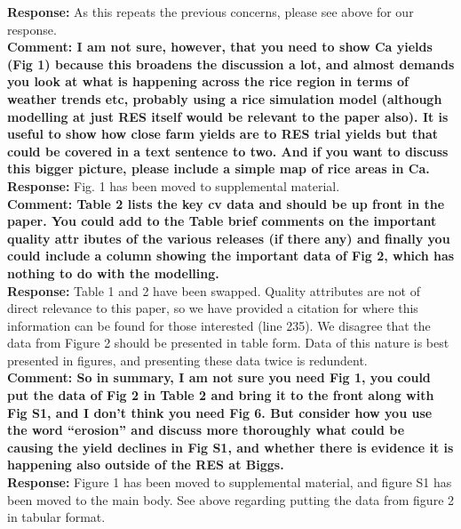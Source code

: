 \documentclass{article} \usepackage[margin=1in]{geometry}
\begin{document}
\textbf{Response:} As this repeats the previous concerns, please see
above for our response.\\

\textbf{Comment: I am not sure, however, that you need to show Ca
  yields (Fig 1) because this broadens the discussion a lot, and
  almost demands you look at what is happening across the rice region
  in terms of weather trends etc, probably using a rice simulation
  model (although modelling at just RES itself would be relevant to
  the paper also). It is useful to show how close farm yields are to
  RES trial yields but that could be covered in a text sentence to
  two. And if you want to discuss this bigger picture, please include
  a simple map of rice areas in Ca.}\\

\textbf{Response:} Fig. 1 has been moved to supplemental material.\\

\textbf{Comment: Table 2 lists the key cv data and should be up front
  in the paper. You could add to the Table brief comments on the
  important quality attr ibutes of the various releases (if there any)
  and finally you could include a column showing the important data of
  Fig 2, which has nothing to do with the modelling.}\\

\textbf{Response:} Table 1 and 2 have been swapped. Quality attributes
are not of direct relevance to this paper, so we have provided a
citation for where this information can be found for those interested
(line 235). We disagree that the data from Figure 2 should be
presented in table form. Data of this nature is best presented in
figures, and presenting these data twice is redundent.\\

\textbf{Comment: So in summary, I am not sure you need Fig 1, you
  could put the data of Fig 2 in Table 2 and bring it to the front
  along with Fig S1, and I don’t think you need Fig 6. But consider
  how you use the word “erosion” and discuss more thoroughly what
  could be causing the yield declines in Fig S1, and whether there is
  evidence it is happening also outside of the RES at Biggs.}\\

\textbf{Response:} Figure 1 has been moved to supplemental material,
and figure S1 has been moved to the main body. See above regarding
putting the data from figure 2 in tabular format.\\
\end{document}
